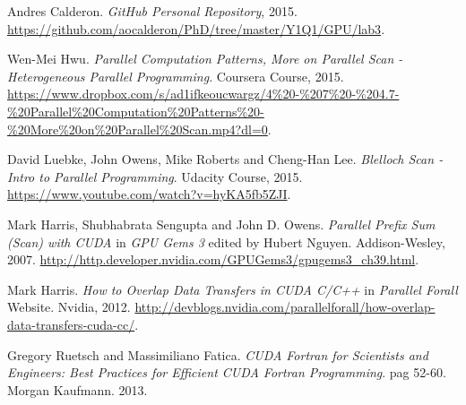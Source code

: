 \documentclass[a4paper,10pt]{scrartcl}
\begin{document}
\begin{thebibliography}{9}
Andres Calderon.
\textit{GitHub Personal Repository}, 2015. 
\url{https://github.com/aocalderon/PhD/tree/master/Y1Q1/GPU/lab3}.
 
Wen-Mei Hwu.
\textit{Parallel Computation Patterns, More on Parallel Scan - Heterogeneous Parallel Programming}. 
Coursera Course, 2015. \url{https://www.dropbox.com/s/ad1ifkeoucwargz/4%20-%207%20-%204.7-%20Parallel%20Computation%20Patterns%20-%20More%20on%20Parallel%20Scan.mp4?dl=0}.

David Luebke, John Owens, Mike Roberts and Cheng-Han Lee.
\textit{Blelloch Scan - Intro to Parallel Programming}. 
Udacity Course, 2015. \url{https://www.youtube.com/watch?v=hyKA5fb5ZJI}.

Mark Harris, Shubhabrata Sengupta and John D. Owens.
\textit{Parallel Prefix Sum (Scan) with CUDA} in \textit{GPU Gems 3} edited by Hubert Nguyen. 
Addison-Wesley, 2007.
\url{http://http.developer.nvidia.com/GPUGems3/gpugems3_ch39.html}.

Mark Harris.
\textit{How to Overlap Data Transfers in CUDA C/C++} in \textit{Parallel Forall} Website. Nvidia, 2012.
\url{http://devblogs.nvidia.com/parallelforall/how-overlap-data-transfers-cuda-cc/}.

Gregory Ruetsch and Massimiliano Fatica.
\textit{CUDA Fortran for Scientists and Engineers: Best Practices for Efficient CUDA Fortran Programming}. pag 52-60.
Morgan Kaufmann. 2013.

\end{thebibliography}
\end{document}
